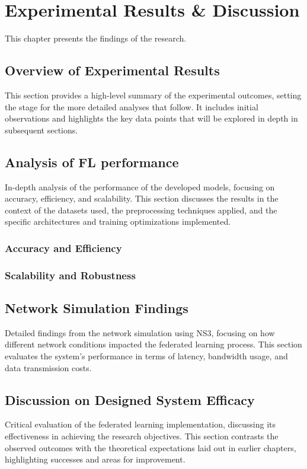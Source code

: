 \chapter{Experimental Results \&  Discussion}
This chapter presents the findings of the research.

\section{Overview of Experimental Results}
This section provides a high-level summary of the experimental outcomes, setting the stage for the more detailed analyses that follow.
It includes initial observations and highlights the key data points that will be explored in depth in subsequent sections.

\section{Analysis of FL performance}
In-depth analysis of the performance of the developed models, focusing on accuracy, efficiency, and scalability. This section discusses
the results in the context of the datasets used, the preprocessing techniques applied, and the specific architectures and training
optimizations implemented.

\subsection{Accuracy and Efficiency}
\subsection{Scalability and Robustness}

\section{Network Simulation Findings}
Detailed findings from the network simulation using NS3, focusing on how different network conditions impacted the federated learning process. This section evaluates the system's performance in terms of latency, bandwidth usage, and data transmission costs.
\section{Discussion on Designed System Efficacy}
Critical evaluation of the federated learning implementation, discussing its effectiveness in achieving the research objectives. This section contrasts the observed outcomes with the theoretical expectations laid out in earlier chapters, highlighting successes and areas for improvement.


